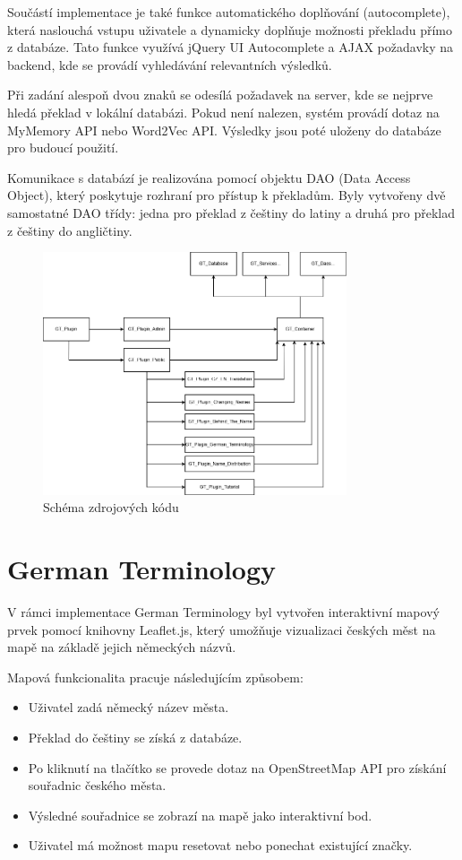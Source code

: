 \documentclass[czech, ba, kiv, he]{fasthesis}
\begin{document}
Součástí implementace je také funkce automatického doplňování (autocomplete), která naslouchá vstupu uživatele a dynamicky doplňuje možnosti překladu přímo z databáze. Tato funkce využívá jQuery UI Autocomplete a AJAX požadavky na backend, kde se provádí vyhledávání relevantních výsledků. 

Při zadání alespoň dvou znaků se odesílá požadavek na server, kde se nejprve hledá překlad v lokální databázi. Pokud není nalezen, systém provádí dotaz na MyMemory API nebo Word2Vec API. Výsledky jsou poté uloženy do databáze pro budoucí použití. 

Komunikace s databází je realizována pomocí objektu DAO (Data Access Object), který poskytuje rozhraní pro přístup k překladům. Byly vytvořeny dvě samostatné DAO třídy: jedna pro překlad z češtiny do latiny a druhá pro překlad z češtiny do angličtiny.

\begin{figure}[h]  
    \centering  
    \includegraphics[width=0.8\textwidth]{genealogy_components.png}  
    \caption{Schéma zdrojových kódu}  
\end{figure}

\section{German Terminology}
V rámci implementace German Terminology byl vytvořen interaktivní mapový prvek pomocí knihovny Leaflet.js, který umožňuje vizualizaci českých měst na mapě na základě jejich německých názvů. 

Mapová funkcionalita pracuje následujícím způsobem:
\begin{itemize}
    \item Uživatel zadá německý název města.
    \item Překlad do češtiny se získá z databáze.
    \item Po kliknutí na tlačítko  se provede dotaz na OpenStreetMap API pro získání souřadnic českého města.
    \item Výsledné souřadnice se zobrazí na mapě jako interaktivní bod.
    \item Uživatel má možnost mapu resetovat nebo ponechat existující značky.
\end{itemize}
\end{document}
